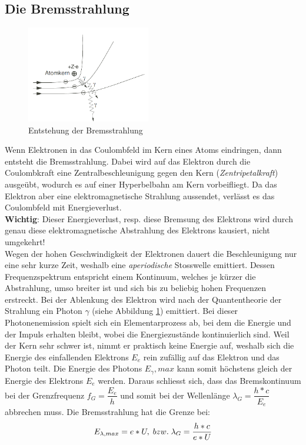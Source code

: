 \subsection{Die Bremsstrahlung}
\begin{figure}
\centering
\includegraphics[width=0.48\textwidth]{Bilder/bremsstrahlung.png} 
\caption{Entstehung der Bremsstrahlung}
\vspace{-1.5cm}
\label{fig:bremsstrahlung}
\end{figure}
Wenn Elektronen in das Coulombfeld im Kern eines Atoms eindringen, dann entsteht die Bremsstrahlung. Dabei wird auf das Elektron durch die Coulombkraft eine Zentralbeschleunigung gegen den Kern (\textit{Zentripetalkraft}) ausgeübt, wodurch es auf einer Hyperbelbahn am Kern vorbeifliegt. Da das Elektron aber eine elektromagnetische Strahlung aussendet, verlässt es das Coulombfeld mit Energieverlust.\\[0.5cm]
\textbf{Wichtig}: Dieser Energieverlust, resp. diese Bremsung des Elektrons wird durch genau diese elektromagnetische Abstrahlung des Elektrons kausiert, nicht umgekehrt!
\\[0.5cm]
Wegen der hohen Geschwindigkeit der Elektronen dauert die Beschleunigung nur eine sehr kurze Zeit, weshalb eine \textit{aperiodische} Stosswelle emittiert. Dessen Frequenzspektrum entspricht einem Kontinuum, welches je kürzer die Abstrahlung, umso breiter ist und sich bis zu beliebig hohen Frequenzen erstreckt. Bei der Ablenkung des Elektron wird nach der Quantentheorie der Strahlung ein Photon $\gamma$ (siehe Abbildung \ref{fig:bremsstrahlung}) emittiert. Bei dieser Photonenemission spielt sich ein Elementarprozess ab, bei dem die Energie und der Impuls erhalten bleibt, wobei die Energiezustände kontinuierlich sind. Weil der Kern sehr schwer ist, nimmt er praktisch keine Energie auf, weshalb sich die Energie des einfallenden Elektrons $E_{e}$ rein zufällig auf das Elektron und das Photon teilt. Die Energie des Photons $E_{\gamma},max$ kann somit höchstens gleich der Energie des Elektrons $E_{e}$ werden. Daraus schliesst sich, dass das Bremskontinuum bei der Grenzfrequenz $f_{G} = \dfrac{E_{e}}{h}$ und somit bei der Wellenlänge $\lambda_{G} = \dfrac{h*c}{E_{e}}$ abbrechen muss.
Die Bremsstrahlung hat die Grenze bei:\\
\begin{equation}
\Large
E_{\lambda,max}=e*U,\; bzw. \; \lambda_{G}=\dfrac{h*c}{e*U}
\end{equation}
\newpage

